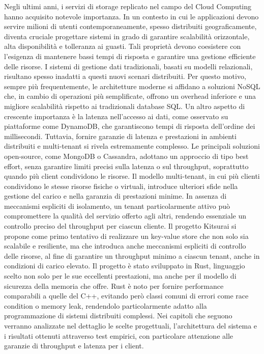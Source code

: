 Negli ultimi anni, i servizi di storage replicato nel campo del Cloud Computing hanno acquisito notevole importanza. 
In un contesto in cui le applicazioni devono servire milioni di utenti contemporaneamente, spesso distribuiti geograficamente, diventa cruciale progettare sistemi in grado di garantire scalabilità orizzontale, alta disponibilità e tolleranza ai guasti.
Tali proprietà devono coesistere con l'esigenza di mantenere bassi tempi di risposta e garantire una gestione efficiente delle risorse.
I sistemi di gestione dati tradizionali, basati su modelli relazionali, risultano spesso inadatti a questi nuovi scenari distribuiti.
Per questo motivo, sempre più frequentemente, le architetture moderne si affidano a soluzioni NoSQL che, in cambio di operazioni più semplificate, offrono un overhead inferiore e una migliore scalabilità rispetto ai tradizionali database SQL.
Un altro aspetto di crescente importanza è la latenza nell'accesso ai dati, come osservato su piattaforme come DynamoDB\cite{Dynamo2007}, che garantiscono tempi di risposta dell'ordine dei millisecondi\cite{DynamoWhitepaper}.
Tuttavia, fornire garanzie di latenza e prestazioni in ambienti distribuiti e multi-tenant si rivela estremamente complesso.
Le principali soluzioni open-source, come MongoDB\cite{Mongo} o Cassandra\cite{Cassandra}, adottano un approccio di tipo best effort, senza garantire limiti precisi sulla latenza o sul throughput, soprattutto quando più client condividono le risorse.
Il modello multi-tenant, in cui più clienti condividono le stesse risorse fisiche o virtuali, introduce ulteriori sfide nella gestione del carico e nella garanzia di prestazioni minime.
In assenza di meccanismi espliciti di isolamento, un tenant particolarmente attivo può compromettere la qualità del servizio offerto agli altri, rendendo essenziale un controllo preciso del throughput per ciascun cliente.
Il progetto Kitsurai si propone come primo tentativo di realizzare un key-value store che non solo sia scalabile e resiliente, ma che introduca anche meccanismi espliciti di controllo delle risorse, al fine di garantire un throughput minimo a ciascun tenant, anche in condizioni di carico elevato.
Il progetto è stato sviluppato in Rust, linguaggio scelto non solo per le sue eccellenti prestazioni, ma anche per il modello di sicurezza della memoria che offre.
Rust è noto per fornire performance comparabili a quelle del C++, evitando però classi comuni di errori come race condition o memory leak, rendendolo particolarmente adatto alla programmazione di sistemi distribuiti complessi.
Nei capitoli che seguono verranno analizzate nel dettaglio le scelte progettuali, l'architettura del sistema e i risultati ottenuti attraverso test empirici, con particolare attenzione alle garanzie di throughput e latenza per i client.
